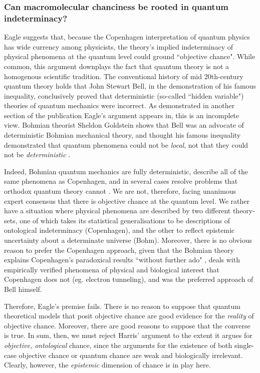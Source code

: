 \subsubsection{Can macromolecular chanciness be rooted in quantum indeterminacy?}
Eagle suggests that, because the Copenhagen interpretation of quantum physics has wide currency among physicists, the theory's implied indeterminacy of physical phenomena at the quantum level could ground ``objective chance". While common, this argument downplays the fact that quantum theory is not a homogenous scientific tradition. The conventional history of mid 20th-century quantum theory holds that John Stewart Bell, in the demonstration of his famous inequality, conclusively proved that deterministic (so-called ``hidden variable") theories of quantum mechanics were incorrect. As demonstrated in another section of the publication Eagle's argument appears in, this is an incomplete view. Bohmian theorist Sheldon Goldstein shows that Bell was an advocate of deterministic Bohmian mechanical theory, and thought his famous inequality demonstrated that quantum phenomena could not be \textit{local}, not that they could not be \textit{deterministic} \cite{Goldstein2017}.

Indeed, Bohmian quantum mechanics are fully deterministic, describe all of the same phenomena as Copenhagen, and in several cases resolve problems that orthodox quantum theory cannot \cite{Goldstein2017}. We are not, therefore, facing unanimous expert consensus that there is objective chance at the quantum level. We rather have a situation where physical phenomena are  described by two different theory-sets, one of which takes its statistical generalisations to be descriptions of ontological indeterminacy (Copenhagen), and the other to reflect epistemic uncertainty about a determinate universe (Bohm). Moreover, there is no obvious reason to prefer the Copenhagen approach, given that the Bohmian theory explains Copenhagen's paradoxical results ``without further ado" \cite{Goldstein2017}, deals with empirically verified phenomena of physical and biological interest that Copenhagen does not (eg. electron tunneling), and was the preferred approach of Bell himself.

Therefore, Eagle's premise fails. There is no reason to suppose that quantum theoretical models that posit objective chance are good evidence for the \textit{reality} of objective chance. Moreover, there are good reasons to suppose that the converse is true. In sum, then, we must reject Harris' argument to the extent it argues for \textit{objective, ontological} chance, since the arguments for the existence of both single-case objective chance or quantum chance are weak and biologically irrelevant. Clearly, however, the \textit{epistemic} dimension of chance is in play here.

